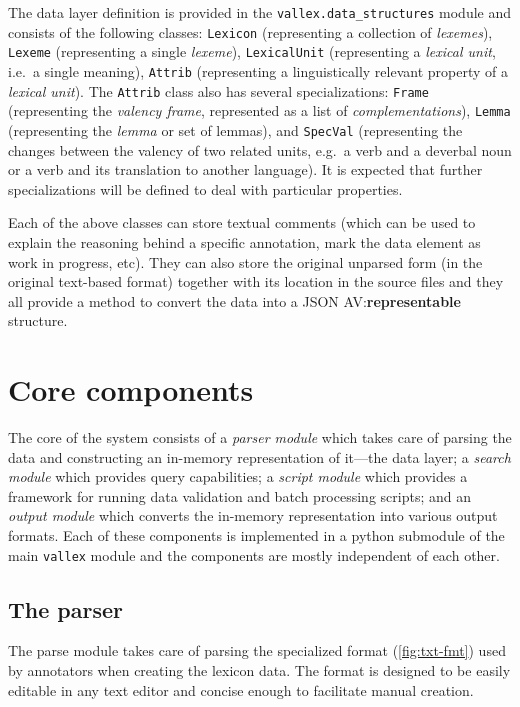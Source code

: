 \documentclass[10pt, a4paper]{article}
\newcommand{\py}[1]{{\tt #1}}
\newcommand{\avout}[2][]{{\color{ansa} AV:}{\color{lightgray}\textbf{#2}} {\color{ansa} #1}}
\begin{document}
The data layer definition is provided in the \py{vallex.data\_structures} module and consists of the
following classes:
\py{Lexicon} (representing a collection of \emph{lexemes}), \py{Lexeme} (representing
a single \emph{lexeme}), \py{LexicalUnit} (representing a \emph{lexical unit}, i.e.\ a single meaning), \py{Attrib} (representing a linguistically relevant property of a \emph{lexical unit}). The \py{Attrib} class also has several specializations:
\py{Frame} (representing the \emph{valency frame}, represented as a list of \emph{complementations}),
\py{Lemma} (representing the \emph{lemma} or set of lemmas), and
\py{SpecVal} (representing the changes between the valency of two related units,
e.g.\ a verb and a deverbal noun or a verb and its translation to another language).
It is expected that further specializations
will be defined to deal with particular properties.

Each of the above classes can store textual comments (which can be used to explain
the reasoning behind a specific annotation, mark the data element as work in progress, etc). They can also
store the original unparsed form (in the original text-based format) together with its location in the
source files and they all provide a method to convert the data into a JSON \avout{representable} structure.

\section{Core components}
The core of the system consists of a \emph{parser module} which takes care of parsing the data and
constructing an in-memory representation of it---the data layer; a \emph{search module} which
provides query capabilities; a \emph{script module} which provides a framework for running data validation
and batch processing scripts; and an \emph{output module} which converts the in-memory representation into
various output formats. Each of these components is implemented in a python submodule of the main \py{vallex}
module and the components are mostly independent of each other.

\subsection{The parser}
The parse module takes care of parsing the specialized format (\autoref{fig:txt-fmt}) used by annotators when creating the lexicon data. The format %
is designed to be easily editable in any text editor and concise enough to facilitate manual creation.
\end{document}
